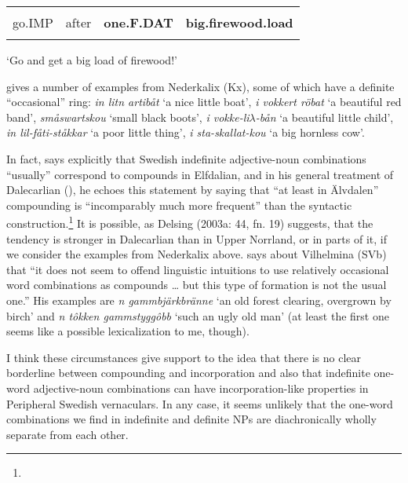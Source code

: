 \begin{tabular}{llll}
\lsptoprule
\multicolumn{4}{l}{Gok

}\\
go.IMP & after & {\bfseries one.F.DAT} & {\bfseries big.firewood.load}\\
\lspbottomrule
\end{tabular}

\begin{styleTranslation}
‘Go and get a big load of firewood!’ 

\end{styleTranslation}

\begin{styleBodyTextFirst}
\citet[141]{Rutberg1924} gives a number of examples from Nederkalix (Kx), some of which have a definite “occasional” ring: \textit{in litn artibåt }‘a nice little boat’, \textit{i vokkert röbat} ‘a beautiful red band’, \textit{småswartskou} ‘small black boots’, \textit{i vokke-li$\lambda $-bån} ‘a beautiful little child’, \textit{in lil-fåti-ståkkar} ‘a poor little thing’, \textit{i sta-skallat-kou} ‘a big hornless cow’.

\end{styleBodyTextFirst}

\begin{styleBodytextC}
In fact, \citet[51]{Levander1909} says explicitly that Swedish indefinite adjective-noun combinations “usually” correspond to compounds in Elfdalian, and in his general treatment of Dalecarlian (\citet[142]{Levander1928}), he echoes this statement by saying that “at least in Älvdalen” compounding is “incomparably much more frequent” than the syntactic construction.\footnote{} It is possible, as Delsing (2003a: 44, fn. 19) suggests, that the tendency is stronger in Dalecarlian than in Upper Norrland, or in parts of it, if we consider the examples from Nederkalix above. \citet[98]{Dahlstedt1962} says about Vilhelmina (SVb) that “it does not seem to offend linguistic intuitions to use relatively occasional word combinations as compounds … but this type of formation is not the usual one.” His examples are \textit{n gammbjärkbränne} ‘an old forest clearing, overgrown by birch’ and \textit{n tôkken gammstyggôbb }‘such an ugly old man’ (at least the first one seems like a possible lexicalization to me, though). 

\end{styleBodytextC}

\begin{styleBodytextC}
I think these circumstances give support to the idea that there is no clear borderline between compounding and incorporation and also that indefinite one-word adjective-noun combinations can have incorporation-like properties in Peripheral Swedish vernaculars. In any case, it seems unlikely that the one-word combinations we find in indefinite and definite NPs are diachronically wholly separate from each other.

\end{styleBodytextC}

